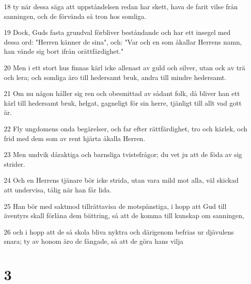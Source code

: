 \par 18 ty när dessa säga att uppståndelsen redan har skett, hava de farit vilse från sanningen, och de förvända så tron hos somliga.
\par 19 Dock, Guds fasta grundval förbliver beståndande och har ett insegel med dessa ord: "Herren känner de sina", och: "Var och en som åkallar Herrens namn, han vände sig bort ifrån orättfärdighet."
\par 20 Men i ett stort hus finnas kärl icke allenast av guld och silver, utan ock av trä och lera; och somliga äro till hedersamt bruk, andra till mindre hedersamt.
\par 21 Om nu någon håller sig ren och obesmittad av sådant folk, då bliver han ett kärl till hedersamt bruk, helgat, gagneligt för sin herre, tjänligt till allt vad gott är.
\par 22 Fly ungdomens onda begärelser, och far efter rättfärdighet, tro och kärlek, och frid med dem som av rent hjärta åkalla Herren.
\par 23 Men undvik dåraktiga och barnsliga tvistefrågor; du vet ju att de föda av sig strider.
\par 24 Och en Herrens tjänare bör icke strida, utan vara mild mot alla, väl skickad att undervisa, tålig när han får lida.
\par 25 Han bör med saktmod tillrättavisa de motspänstiga, i hopp att Gud till äventyrs skall förläna dem bättring, så att de komma till kunskap om sanningen,
\par 26 och i hopp att de så skola bliva nyktra och därigenom befrias ur djävulens snara; ty av honom äro de fångade, så att de göra hans vilja

\chapter{3}

